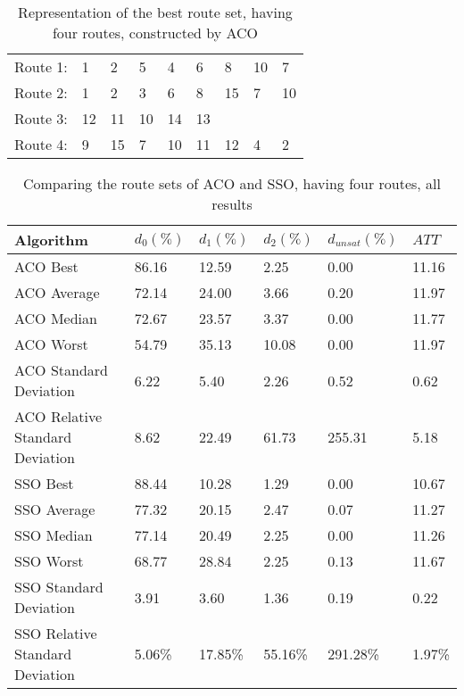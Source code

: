 \begin{table}[H]
    \centering
    \begin{tabular}{|l|llllllll|}
    \hline
    Route 1: & 1 & 2 & 5 & 4 & 6 & 8 & 10 & 7 \\
    Route 2: & 1 & 2 & 3 & 6 & 8 & 15 & 7 & 10 \\
    Route 3: & 12 & 11 & 10 & 14 & 13 &  &  & \\
    Route 4: & 9 & 15 & 7 & 10 & 11 & 12 & 4 & 2 \\
    \hline
    \end{tabular}
    \caption {Representation of the best route set, having four routes, constructed by ACO}
    \label{table:performanceComparison_bestRouteSet4_ACO}
\end{table}

    \begin{table}[H]
    \centering
    \begin{tabular}{|l||l|l|l|l|l|}
    \hline
    Algorithm & $d_0(\%)$ & $d_1(\%)$ & $d_2(\%)$ & $d_{unsat}(\%)$ & $ATT$ \\
    \hline
    ACO Best & 86.16 & 12.59 & 2.25 & 0.00 & 11.16 \\
    ACO Average & 72.14 & 24.00 & 3.66 & 0.20 & 11.97 \\
    ACO Median & 72.67 & 23.57 & 3.37 & 0.00 & 11.77 \\
    ACO Worst & 54.79 & 35.13 & 10.08 & 0.00 & 11.97 \\
    ACO Standard Deviation & 6.22 & 5.40 & 2.26 & 0.52 & 0.62 \\
    ACO Relative Standard Deviation & 8.62 & 22.49 & 61.73 & 255.31 & 5.18 \\
    \hline
    \hline
    SSO Best & 88.44 & 10.28 & 1.29 & 0.00 & 10.67 \\
    SSO Average & 77.32 & 20.15 & 2.47 & 0.07 & 11.27 \\
    SSO Median & 77.14 & 20.49 & 2.25 & 0.00 & 11.26 \\
    SSO Worst & 68.77 & 28.84 & 2.25 & 0.13 & 11.67 \\
    SSO Standard Deviation & 3.91 & 3.60 & 1.36 & 0.19 & 0.22 \\
    SSO Relative Standard Deviation & 5.06\% & 17.85\% & 55.16\% & 291.28\% & 1.97\% \\
    \hline
    \end{tabular}
    \caption {Comparing the route sets of ACO and SSO, having four routes, all results}
    \label{table:performanceComparison_ACOFull}
    \end{table}



